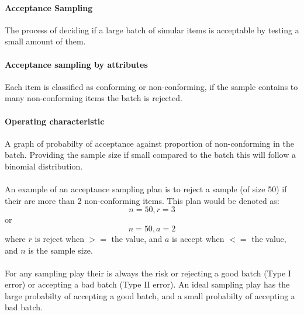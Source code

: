     \paragraph{Acceptance Sampling}
    The process of deciding if a large batch of simular items is acceptable by testing a small amount of them.

    \paragraph{Acceptance sampling by attributes} 
    Each item is classified as conforming or non-conforming, if the sample contains to many non-conforming items the batch is rejected.

    \paragraph{Operating characteristic}
    A graph of probabilty of acceptance against proportion of non-conforming in the batch. Providing the sample size if small compared to the batch this will follow a binomial distribution.\\
    \\
    An example of an acceptance sampling plan is to reject a sample (of size 50) if their are more than 2 non-conforming items. This plan would be denoted as:
    $$n = 50, r = 3$$
    or
    $$n = 50, a = 2$$
    where $r$ is reject when $>=$ the value, and $a$ is accept when $<=$ the value, and $n$ is the sample size.\\
    \\
    For any sampling play their is always the risk or rejecting a good batch (Type I error) or accepting a bad batch (Type II error). An ideal sampling play has the large probabilty of accepting a good batch, and a small probabilty of accepting a bad batch.

